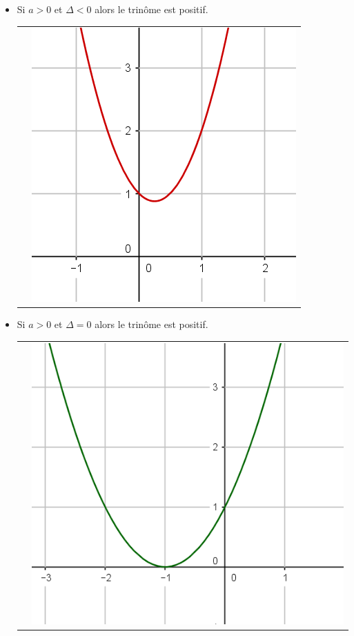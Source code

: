 \documentclass[12pt,a4paper]{article}
\begin{document}
			
			\begin{itemize}
				\item 
				Si $a > 0$ et $\Delta < 0$ alors	le trinôme est positif.
				
				\begin{tabular}{ll }
					 &
					
					\includegraphics[scale=0.5]{./img/fig_5}\\
				\end{tabular}
					
					
				\item 
				Si $a > 0$ et $\Delta = 0$ alors le trinôme est positif.
				
				\begin{tabular}{ll }
					 &
					
					\includegraphics[scale=0.35]{./img/fig_1}\\
				\end{tabular}	
									

\end{itemize}
\end{document}
